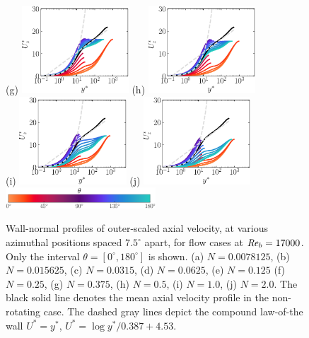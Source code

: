 \documentclass[lineno]{jfm}
\begin{document}
\begin{figure}
                (g) \includegraphics[width=4cm]{Figures/prof_uzstar_rotz0_roty0.1875.eps}
                (h) \includegraphics[width=4cm]{Figures/prof_uzstar_rotz0_roty0.25.eps} \\
                (i) \includegraphics[width=4cm]{Figures/prof_uzstar_rotz0_roty0.5.eps}
                (j) \includegraphics[width=4cm]{Figures/prof_uzstar_rotz0_roty1.0.eps} \\
                \includegraphics[width=0.5\textwidth]{Figures/theta_cmap.eps}
        \caption{
                Wall-normal profiles of
                outer-scaled axial velocity,
                at various azimuthal positions spaced
                $7.5^\circ$ apart,
                for flow cases at $\mbox{\textit{Re}}_b=17000$.
                Only the interval $\theta = [0^{\circ},180^{\circ}]$ is shown.
                (a) $N = 0.0078125$,
                (b) $N = 0.015625$,
                (c) $N = 0.0315$,
                (d) $N = 0.0625$,
                (e) $N = 0.125$
                (f) $N = 0.25$,
                (g) $N = 0.375$,
                (h) $N = 0.5$,
                (i) $N = 1.0$,
                (j) $N = 2.0$.
                The black solid line denotes the mean axial velocity profile in the
                non-rotating case.
                The dashed gray lines depict the compound law-of-the wall
                $U^*=y^*$, $U^*=\log y^*/0.387 + 4.53$.
        }
                \label{fig:ustar}
        \end{figure}
\end{document}
